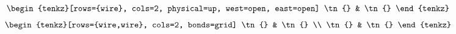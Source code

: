\documentclass{article}
\begin{document}
\tenkzkernel
\[\begin{gathered}
  \begin{tenkz}[rows={wire}, cols=2, physical=up, west=open, east=open]
    \tn{} & \tn{}
  \end{tenkz}
\end{gathered}\]
\[\begin{aligned}
  \begin{tenkz}[rows={wire,wire}, cols=2, bonds=grid]
    \tn{} & \tn{} \\
    \tn{} & \tn{}
  \end{tenkz}
\end{aligned}\]
\end{document}
